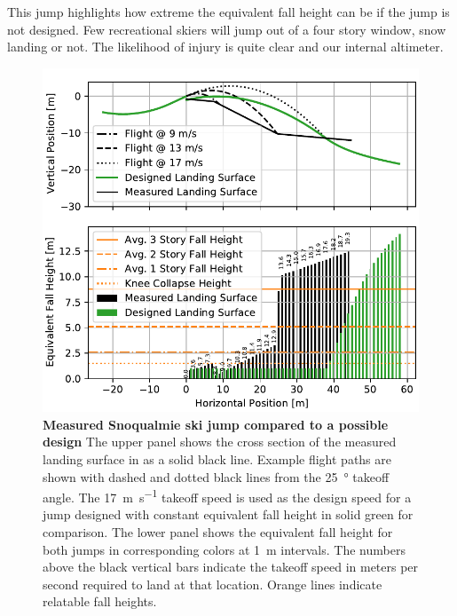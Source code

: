 \documentclass{article}
\begin{document}
This jump highlights how extreme the equivalent fall height can be if the jump
is not designed. Few recreational skiers will jump out of a four story window,
snow landing or not. The likelihood of injury is quite clear and our internal
altimeter.
%
\begin{figure}
  \centering
  \includegraphics[width=5.25in]{figures/salvini-v-snoqualmie.pdf}
  \caption{\textbf{Measured Snoqualmie ski jump compared to a possible design}
  The upper panel shows the cross section of the measured landing surface in as
  a solid black line. Example flight paths are shown with dashed and dotted
  black lines from the 25~\si{\degree} takeoff angle. The
  17~\si{\meter\per\second} takeoff speed is used as the design speed for a
  jump designed with constant equivalent fall height in solid green for
  comparison. The lower panel shows the equivalent fall height for both jumps
  in corresponding colors at 1~\si{\meter} intervals. The numbers above the
  black vertical bars indicate the takeoff speed in meters per second required
  to land at that location. Orange lines indicate relatable fall heights.}
  \label{fig:salvini-v-snoqualmie}
\end{figure}
\end{document}
